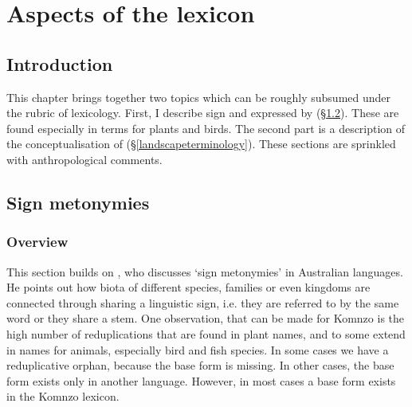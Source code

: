 
\chapter{Aspects of the lexicon} \label{cha:lexicon}

\section{Introduction}

This chapter brings together two topics which can be roughly subsumed under the rubric of lexicology. First, I describe sign  and  expressed by  (\S{}\ref{redupmeton}). These are found especially in terms for plants and birds. The second part is a description of the conceptualisation of  (\S{}\ref{landscapeterminology}). These sections are sprinkled with anthropological comments.

\section{Sign metonymies}\label{redupmeton}

\subsection{Overview}

This section builds on \citep{Evans:1997vj}, who discusses `sign metonymies' in Australian languages. He points out how biota of different species, families or even kingdoms are connected through sharing a linguistic sign, i.e. they are referred to by the same word or they share a stem. One observation, that can be made for Komnzo is the high number of reduplications that are found in plant names, and to some extend in names for animals, especially bird and fish species. In some cases we have a reduplicative orphan, because the base form is missing. In other cases, the base form exists only in another language. However, in most cases a base form exists in the Komnzo lexicon.\\

